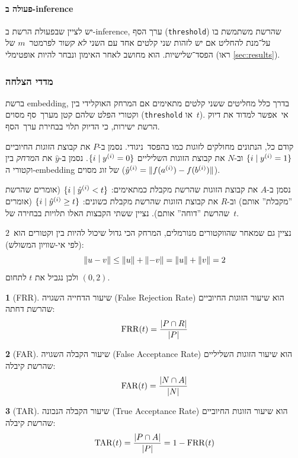 \documentclass[hebrew, a4paper]{article}
\theoremstyle{plain}
\theoremstyle{definition}
\newtheorem{definition}{\definitionname}[section]
\numberwithin{equation}{section}
\DeclarePairedDelimiter\abs{\lvert}{\rvert}
\DeclarePairedDelimiter\norm{\lVert}{\rVert}
\DeclarePairedDelimiter\set{\{}{\}}
\DeclareMathOperator\FAR{FAR}
\DeclareMathOperator\FRR{FRR}
\DeclareMathOperator\TAR{TAR}
\begin{document}
\paragraph{פעולה ב-inference}

יש לציין שבפעולת הרשת ב-inference, ערך הסף (\verb|threshold|) שהרשת
משתמשת בו על־מנת להחליט אם יש לזהות שני קלטים אחד עם השני \emph{לא
  קשור} לפרמטר~$m$ של הפסד־שלישיות. הוא מחושב לאחר האימון ונבחר להיות
אופטימלי (ראו \autoref{sec:results}).

\subsubsection{מדדי הצלחה}
\label{sec:contrastive-metrics}

ברשת embedding, בדרך כלל מחליטים ששני קלטים מתאימים אם המרחק האוקלידי
בין וקטורי הפלט שלהם קטן מערך~סף מסוים (\verb|threshold| או~$t$).
אי~אפשר למדוד את דיוק הרשת ישירות, כי הדיוק תלוי בבחירת ערך~הסף.

קודם כל, הנתונים מחולקים לזוגות כמו בהפסד~ניגודי. נסמן ב-$P$ את קבוצת
הזוגות החיוביים $\set{i \mid y^{(i)} = 1}$ וב-$N$ את קבוצת הזוגות
השליליים $\set{i \mid y^{(i)} = 0}$. נסמן ב-$\hat{y}$ את ה\emph{מרחק}
בין וקטורי ה-embedding של זוג מסוים
($\hat{y}^{(i)} = \norm{f(a^{(i)}) - f(b^{(i)})}$).

נסמן ב-$A$ את קבוצת הזוגות שהרשת מקבלת כמתאימים:
$\set{i \mid \hat{y}^{(i)} < t}$ (אומרים שהרשת ”מקבלת” אותם) וב-$R$ את
קבוצת הזוגות שהרשת מקבלת כשונים: $\set{i \mid \hat{y}^{(i)} \geq t}$
(אומרים שהרשת ”דוחה” אותם). נציין ששתי הקבצות האלו תלויות בבחירה
של~$t$.

נציין גם שמאחר שהווקטורים מנורמלים, המרחק הכי גדול שיכול להיות בין
וקטורים הוא~$2$ (לפי אי-שוויון המשולש):
\[
  \norm{u - v} \leq \norm{u} + \norm{-v} = \norm{u} + \norm{v} = 2
\]
ולכן נגביל את $t$ לתחום $(0,2)$.

\begin{definition}[FRR]\label{defn:frr}
  שיעור הדחייה השגויה (False Rejection Rate) הוא שיעור הזוגות החיוביים
  שהרשת דחתה:
  \[
    \FRR(t) = \frac{\abs{P \cap R}}{\abs{P}}
  \]
\end{definition}

\begin{definition}[FAR]\label{defn:far}
  שיעור הקבלה השגויה (False Acceptance Rate) הוא שיעור הזוגות השליליים
  שהרשת קיבלה:
  \[
    \FAR(t) = \frac{\abs{N \cap A}}{\abs{N}}
  \]
\end{definition}

\begin{definition}[TAR]\label{defn:tar}
  שיעור הקבלה הנכונה (True Acceptance Rate) הוא שיעור הזוגות החיוביים שהרשת קיבלה:
  \[
    \TAR(t) = \frac{\abs{P \cap A}}{\abs{P}} = 1 - \FRR(t)
  \]
\end{definition}
\end{document}
